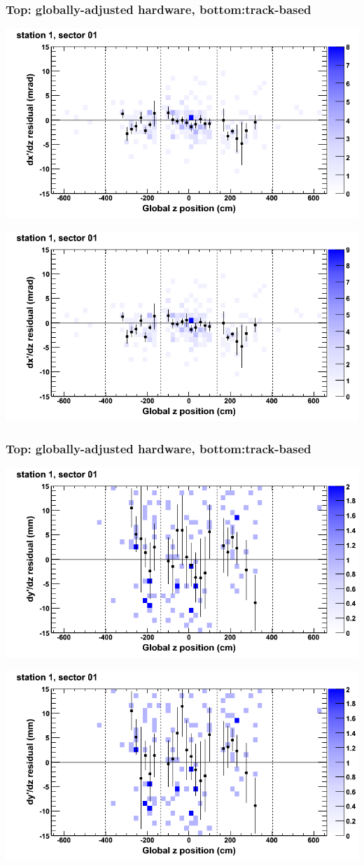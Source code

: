 \documentclass[compress]{beamer}
\begin{document}
\begin{frame}
\frametitle{Top: globally-adjusted hardware, bottom:track-based}
\includegraphics[width=0.7\linewidth]{NOV4_mapplots_HW/DTvsz_st1sec01_dxdz.png}

\includegraphics[width=0.7\linewidth]{NOV4_mapplots/DTvsz_st1sec01_dxdz.png}
\end{frame}

\begin{frame}
\frametitle{Top: globally-adjusted hardware, bottom:track-based}
\includegraphics[width=0.7\linewidth]{NOV4_mapplots_HW/DTvsz_st1sec01_dydz.png}

\includegraphics[width=0.7\linewidth]{NOV4_mapplots/DTvsz_st1sec01_dydz.png}
\end{frame}
\end{document}
